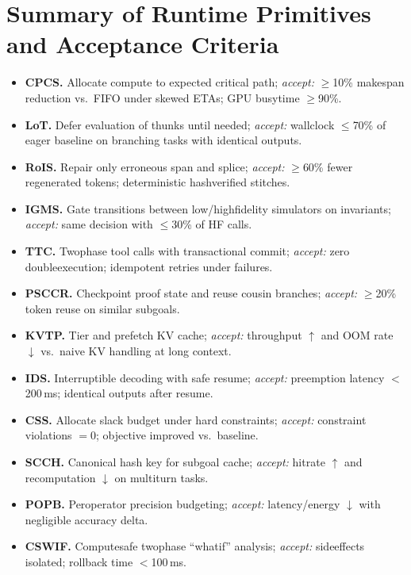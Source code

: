 \documentclass[
]{article}
\begin{document}
\section*{Summary of Runtime Primitives and Acceptance Criteria}
\begin{itemize}
  \item \textbf{CPCS.} Allocate compute to expected critical path; \emph{accept:} $\ge$10\% makespan reduction vs.\ FIFO under skewed ETAs; GPU busy\-time $\ge$90\%.
  \item \textbf{LoT.} Defer evaluation of thunks until needed; \emph{accept:} wall\-clock $\le$70\% of eager baseline on branching tasks with identical outputs.
  \item \textbf{RoI\-S.} Repair only erroneous span and splice; \emph{accept:} $\ge$60\% fewer regenerated tokens; deterministic hash\-verified stitches.
  \item \textbf{IGMS.} Gate transitions between low/high\-fidelity simulators on invariants; \emph{accept:} same decision with $\le$30\% of HF calls.
  \item \textbf{TTC.} Two\-phase tool calls with transactional commit; \emph{accept:} zero double\-execution; idempotent retries under failures.
  \item \textbf{PSC\-CR.} Checkpoint proof state and reuse cousin branches; \emph{accept:} $\ge$20\% token reuse on similar subgoals.
  \item \textbf{KVT\-P.} Tier and prefetch KV cache; \emph{accept:} throughput $\uparrow$ and OOM rate $\downarrow$ vs.\ naive KV handling at long context.
  \item \textbf{IDS.} Interruptible decoding with safe resume; \emph{accept:} preemption latency $<$200\,ms; identical outputs after resume.
  \item \textbf{CSS.} Allocate slack budget under hard constraints; \emph{accept:} constraint violations $=0$; objective improved vs.\ baseline.
  \item \textbf{SCCH.} Canonical hash key for subgoal cache; \emph{accept:} hit\-rate $\uparrow$ and recomputation $\downarrow$ on multi\-turn tasks.
  \item \textbf{POPB.} Per\-operator precision budgeting; \emph{accept:} latency/energy $\downarrow$ with negligible accuracy delta.
  \item \textbf{CS\-WIF.} Compute\-safe two\-phase ``what\-if'' analysis; \emph{accept:} side\-effects isolated; rollback time $<$100\,ms.
\end{itemize}
\end{document}

